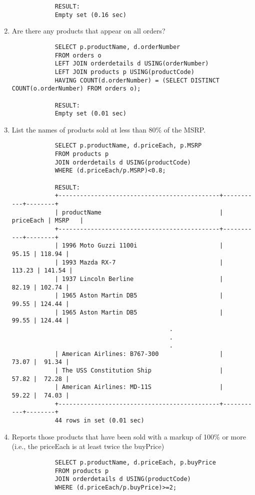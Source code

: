 \documentclass{article}
\begin{document}
\begin{enumerate}
\begin{verbatim}
			RESULT:
			Empty set (0.16 sec)
			\end{verbatim}
		\item Are there any products that appear on all orders?
			\begin{verbatim}
			SELECT p.productName, d.orderNumber
			FROM orders o
			LEFT JOIN orderdetails d USING(orderNumber)
			LEFT JOIN products p USING(productCode)
			HAVING COUNT(d.orderNumber) = (SELECT DISTINCT COUNT(o.orderNumber) FROM orders o);
			
			RESULT:
			Empty set (0.01 sec)
			\end{verbatim}
		\item List the names of products sold at less than 80\% of the MSRP.
			\begin{verbatim}
			SELECT p.productName, d.priceEach, p.MSRP
			FROM products p
			JOIN orderdetails d USING(productCode)
			WHERE (d.priceEach/p.MSRP)<0.8;
			
			RESULT:
			+---------------------------------------------+-----------+--------+
			| productName                                 | priceEach | MSRP   |
			+---------------------------------------------+-----------+--------+
			| 1996 Moto Guzzi 1100i                       |     95.15 | 118.94 |
			| 1993 Mazda RX-7                             |    113.23 | 141.54 |
			| 1937 Lincoln Berline                        |     82.19 | 102.74 |
			| 1965 Aston Martin DB5                       |     99.55 | 124.44 |
			| 1965 Aston Martin DB5                       |     99.55 | 124.44 |
			                                .
			                                .
			                                .
			| American Airlines: B767-300                 |     73.07 |  91.34 |
			| The USS Constitution Ship                   |     57.82 |  72.28 |
			| American Airlines: MD-11S                   |     59.22 |  74.03 |
			+---------------------------------------------+-----------+--------+
			44 rows in set (0.01 sec)
			\end{verbatim}
		\item Reports those products that have been sold with a markup of 100\% or more (i.e.,  the priceEach is at least twice the buyPrice)
			\begin{verbatim}
			SELECT p.productName, d.priceEach, p.buyPrice
			FROM products p
			JOIN orderdetails d USING(productCode)
			WHERE (d.priceEach/p.buyPrice)>=2;
			

\end{verbatim}
\end{enumerate}
\end{document}
